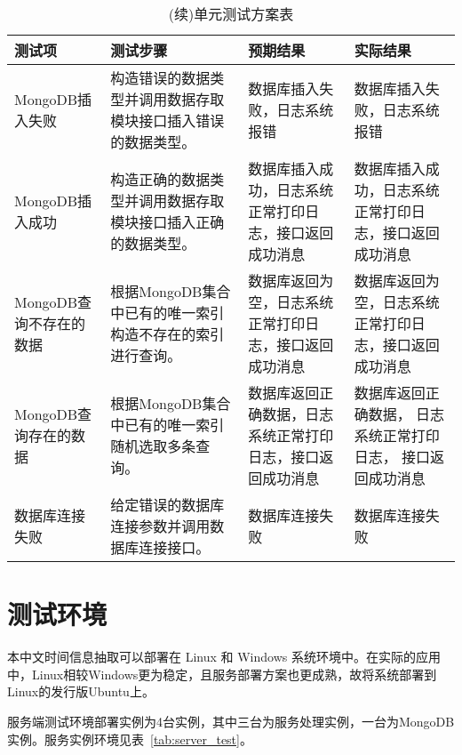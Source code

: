 \begin{table}[h]
    \centering
    \renewcommand\thetable{6.2}
    \caption{(续)单元测试方案表}
    \begin{tabularx}{\linewidth}{|Y|Y|Y|Y|}
        \hline
        测试项                  & 测试步骤                                                     & 预期结果                                                   & 实际结果                                                     \\
        \hline
        MongoDB插入失败         & 构造错误的数据类型并调用数据存取模块接口插入错误的数据类型。 & 数据库插入失败，日志系统报错                               & 数据库插入失败，日志系统报错                                 \\
        \hline
        MongoDB插入成功         & 构造正确的数据类型并调用数据存取模块接口插入正确的数据类型。 & 数据库插入成功，日志系统正常打印日志，接口返回成功消息     & 数据库插入成功，日志系统正常打印日志，接口返回成功消息       \\
        \hline
        MongoDB查询不存在的数据 & 根据MongoDB集合中已有的唯一索引构造不存在的索引进行查询。    & 数据库返回为空，日志系统正常打印日志，接口返回成功消息     & 数据库返回为空，日志系统正常打印日志，接口返回成功消息       \\
        \hline
        MongoDB查询存在的数据   & 根据MongoDB集合中已有的唯一索引随机选取多条查询。            & 数据库返回正确数据，日志系统正常打印日志，接口返回成功消息 & 数据库返回正确数据， 日志系统正常打印日志， 接口返回成功消息 \\
        \hline
        数据库连接失败          & 给定错误的数据库连接参数并调用数据库连接接口。               & 数据库连接失败                                             & 数据库连接失败                                               \\
        \hline
    \end{tabularx}
    \label{tab:unit_test2}
\end{table}


\section{测试环境}

本中文时间信息抽取可以部署在 Linux 和 Windows 系统环境中。在实际的应用中，Linux相较Windows更为稳定，且服务部署方案也更成熟，故将系统部署到Linux的发行版Ubuntu上。

服务端测试环境部署实例为4台实例，其中三台为服务处理实例，一台为MongoDB实例。服务实例环境见表~\ref{tab:server_test}。



